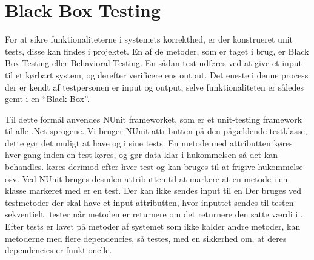 \section{Black Box Testing}\label{BBtest}
For at sikre funktionaliteterne i systemets korrekthed, er der konstrueret unit tests, disse kan findes i  projektet.
En af de metoder, som er taget i brug, er Black Box Testing eller Behavioral Testing.
En sådan test udføres ved at give et input til et kørbart system, og derefter verificere ens output.
Det eneste i denne process der er kendt af testpersonen er input og output, selve funktionaliteten er således gemt i en ``Black Box''. \citep{Black_Box}

Til dette formål anvendes NUnit frameworket, som er et unit-testing framework til alle .Net sprogene.
Vi bruger NUnit attributten \class{[TestFixture]} på den pågældende testklasse, dette gør det muligt at have \class{[SetUp]} og \class{[TearDown]} i sine tests.
En metode med attributten \class{[Setup]} køres hver gang inden en test køres, og gør data klar i hukommelsen så det kan behandles.
\class{[TearDown]} køres derimod efter hver test og kan bruges til at frigive hukommelse osv.
Ved NUnit bruges desuden attributten  til at markere at en metode i en klasse markeret med  er en test.
Der kan ikke sendes input til en \class{[Test]} 
Der bruges ved testmetoder der skal have et input \class{[TestCase(inputA, inputB, Result=value)]} attributten, hvor inputtet sendes til testen sekventielt.
 tester når metoden er returnere om det returnere den satte værdi i . 
Efter tests er lavet på metoder af systemet som ikke kalder andre metoder, kan metoderne med flere dependencies, så testes, med en sikkerhed om, at deres dependencies er funktionelle.
\citep{Unit_Testing}

